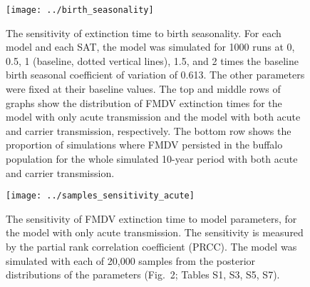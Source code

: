 \documentclass[12pt, UKenglish]{article}  %
\begin{document}
\begin{figure}
  \centering
  \texttt{[image: ../birth\_seasonality]}
  \caption{The sensitivity of extinction time to birth seasonality.
    For each model and each SAT, the model was simulated for
    1000 runs at 0, 0.5, 1 (baseline, dotted vertical lines), 1.5, and
    2 times the baseline birth seasonal coefficient of variation of
    0.613.
    The other parameters were fixed at their baseline values.
    The top and middle rows of graphs show the distribution of
    FMDV extinction times for the model with only acute transmission
    and the model with both acute and carrier transmission,
    respectively.
    The bottom row shows the proportion of simulations where FMDV
    persisted in the buffalo population for the whole simulated
    10-year period with both acute and carrier transmission.}
\end{figure}


\begin{figure}
  \centering
  \texttt{[image: ../samples\_sensitivity\_acute]}
  \caption{The sensitivity of FMDV extinction time to model
    parameters, for the model with only acute transmission.
    The sensitivity is measured by the partial rank correlation
    coefficient (PRCC). The model was simulated with each of 20,000
    samples from the posterior distributions of the parameters
    (Fig.~2; Tables S1, S3, S5, S7).}
\end{figure}
\end{document}

